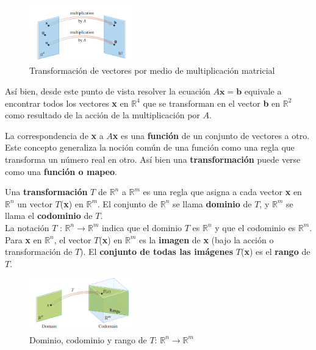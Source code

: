\documentclass[12 pt]{article}
\begin{document}
\begin{figure}[ht]
  \centerline{\includegraphics[width=0.4\textwidth]{image16.png}}
  \caption{Transformación de vectores por medio de multiplicación matricial}
\end{figure}

Así bien, desde este punto de vista resolver la ecuación $A\mathbf{x} = \mathbf{b}$ equivale a encontrar todos los vectores \textbf{x} en $\mathbb{R}^4$ que se transforman en el vector \textbf{b} en $\mathbb{R}^2$ como resultado de la acción de la multiplicación por $A$.

La correspondencia de \textbf{x} a $A$\textbf{x} es una \textbf{función} de un conjunto de vectores a otro. Este concepto generaliza la noción común de una función como una regla que transforma un número real en otro. Así bien una \textbf{transformación} puede verse como una \textbf{función o mapeo}.

Una \textbf{transformación} $T$ de $\mathbb{R}^n$ a $\mathbb{R}^m$ es una regla que asigna a cada vector \textbf{x} en $\mathbb{R}^n$ un vector $T$(\textbf{x}) en $\mathbb{R}^m$. El conjunto de $\mathbb{R}^n$ se llama \textbf{dominio} de $T$, y $\mathbb{R}^m$ se llama el \textbf{codominio} de $T$.\\ La notación $T$ : $\mathbb{R}^n \rightarrow \mathbb{R}^m$ indica que el dominio $T$ es $\mathbb{R}^n$ y que el codominio es $\mathbb{R}^m$. Para \textbf{x} en $\mathbb{R}^n$, el vector $T$(\textbf{x}) en $\mathbb{R}^m$ es la \textbf{imagen} de \textbf{x} (bajo la acción o transformación de $T$). El \textbf{conjunto de todas las imágenes} $T$(\textbf{x}) es el \textbf{rango} de $T$.

\begin{figure}[ht]
  \centerline{\includegraphics[width=0.4\textwidth]{image17.png}}
  \caption{Dominio, codominio y rango de $T$: $\mathbb{R}^n \rightarrow \mathbb{R}^m$}
  \label{}
\end{figure}
\end{document}
